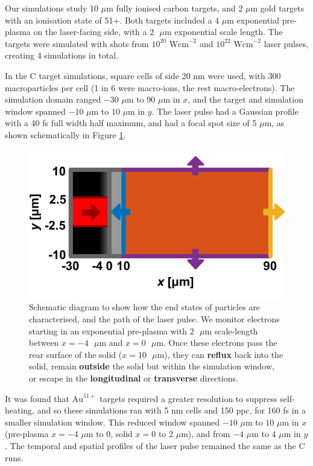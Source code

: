 \documentclass[12pt]{article}
\numberwithin{equation}{section}
\begin{document}
Our simulations study 10 $\mu$m fully ionised carbon targets, and 2 $\mu$m gold targets with an ionisation state of 51+. Both targets included a 4 $\mu$m exponential pre-plasma on the laser-facing side, with a $2\text{ }\mu$m exponential scale length. The targets were simulated with shots from $10^{20} \text{ Wcm}^{-2}$ and $10^{22} \text{ Wcm}^{-2}$ laser pulses, creating 4 simulations in total.

In the C target simulations, square cells of side 20 nm were used, with 300 macroparticles per cell (1 in 6 were macro-ions, the rest macro-electrons). The simulation domain ranged $-30$ $\mu$m to $90$ $\mu$m in $x$, and the target and simulation window spanned $-10$ $\mu$m to $10$ $\mu$m in $y$. The laser pulse had a Gaussian profile with a 40 fs full width half maximum, and had a focal spot size of 5 $\mu$m, as shown schematically in Figure \ref{fig:tnsa_probe_schematic}.

\begin{figure}
\centering
  \includegraphics[width=0.6\linewidth]{Figures/tnsa_diagram.png}
\caption{Schematic diagram to show how the end states of particles are characterised, and the path of the laser pulse. We monitor electrons starting in an exponential pre-plasma with $2\text{ }\mu$m scale-length between $x=-4\text{ }\mu$m and $x=0\text{ }\mu$m. Once these electrons pass the rear surface of the solid ($x=10\text{ }\mu$m), they can \textbf{\textcolor{matlabBlue}{reflux}} back into the solid, remain \textbf{\textcolor{matlabOrange}{outside}} the solid but within the simulation window, or escape in the \textbf{\textcolor{matlabYellow}{longitudinal}} or \textbf{\textcolor{matlabPurple}{transverse}} directions.}
\label{fig:tnsa_probe_schematic}
\end{figure}

It was found that $\text{Au}^{51+}$ targets required a greater resolution to suppress self-heating, and so these simulations ran with 5 nm cells and 150 ppc, for 160 fs in a smaller simulation window. This reduced window spanned $-10$ $\mu$m to $10$ $\mu$m in $x$ (pre-plasma $x=-4$ $\mu$m to 0, solid $x=0$ to 2 $\mu$m), and from  $-4$ $\mu$m to $4$ $\mu$m in $y$. The temporal and spatial profiles of the laser pulse remained the same as the C runs.
\end{document}
